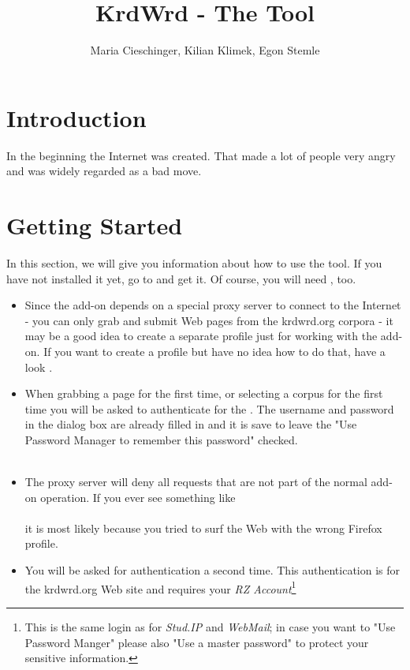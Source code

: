\documentclass[12pt]{article}
\title{KrdWrd - The Tool}
\author{Maria Cieschinger, Kilian Klimek, Egon Stemle}
\begin{document}
\maketitle

\section{Introduction}

In the beginning the Internet was created. That made a lot of people very angry and was widely regarded as a bad move.


\section{Getting Started}
In this section, we will give you information about how to use the tool. If you have not installed it yet, go to  and get it. Of course, you will need , too. \\

\begin{itemize}
\item Since the add-on depends on a special proxy server to connect to the Internet - you can only grab and submit Web pages from the krdwrd.org corpora - it may be a good idea to create a separate profile just for working with the add-on. If you want to create a profile but have no idea how to do that, have a look . \\
\item When grabbing a page for the first time, or selecting a corpus for the first time you will be asked to authenticate for the . The username and password in the dialog box are already filled in and it is save to leave the "Use Password Manager to remember this password" checked. \\
 \\

\item The proxy server will deny all requests that are not part of the normal add-on operation. If you ever see something like \\
 \\
it is most likely because you tried to surf the Web with the wrong Firefox profile. \\

\item You will be asked for authentication a second time. This authentication is for the krdwrd.org Web site and requires your \emph{RZ Account}\footnote{This is the same login as for \emph{Stud.IP} and \emph{WebMail}; in case you want to "Use Password Manger" please also "Use a master password" to protect your sensitive information.} \\

\end{itemize}
\end{document}
